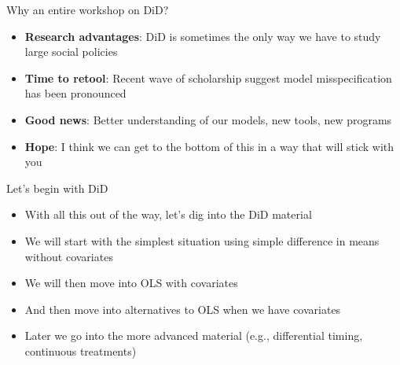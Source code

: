 \documentclass{beamer}
\begin{document}
\begin{frame}{Why an entire workshop on DiD?}

\begin{itemize}
\item \textbf{Research advantages}: DiD is sometimes the only way we have to study large social policies 
\item \textbf{Time to retool}: Recent wave of scholarship suggest model misspecification has been pronounced
\item \textbf{Good news}: Better understanding of our models, new tools, new programs
\item \textbf{Hope}: I think we can get to the bottom of this in a way that will stick with you
\end{itemize}

\end{frame}







\begin{frame}{Let's begin with DiD}

\begin{itemize}
\item With all this out of the way, let's dig into the DiD material
\item We will start with the simplest situation using simple difference in means without covariates
\item We will then move into OLS with covariates
\item And then move into alternatives to OLS when we have covariates
\item Later we go into the more advanced material (e.g., differential timing, continuous treatments)
\end{itemize}

\end{frame}
\end{document}
